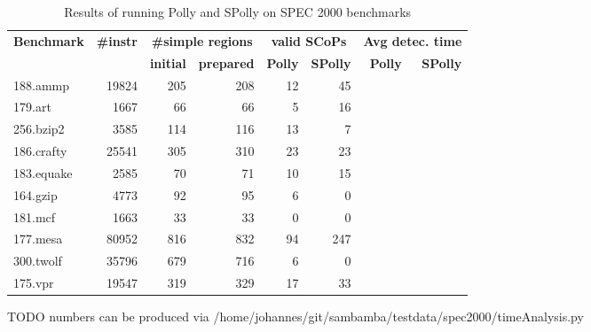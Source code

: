 \begin{table}[htbp]
  \caption{Results of running Polly and SPolly on SPEC 2000 benchmarks}
  \begin{tabular}{| l | r | r | r | r | r | r | r |}
    \hline
    \multirow{2}{*}{\textbf{Benchmark}} & \multirow{2}{*}{\textbf{\#instr}} & \multicolumn{2}{c|}{\textbf{\#simple regions}} &  \multicolumn{2}{c|}{\textbf{valid SCoPs}} &  \multicolumn{2}{c|}{\textbf{Avg detec. time}} \\
    \cline{3-8} 
    & & \textbf{initial} & \textbf{prepared} & \textbf{Polly} & \textbf{SPolly} & \textbf{Polly} & \textbf{SPolly} \\
    \hline
    \hline
    188.ammp   & 19824  & 205 & 208 & 12 & 45 & &  \\
    179.art    &  1667  & 66  &  66 &  5 & 16 & &  \\
    256.bzip2  &  3585  & 114 & 116 & 13 &  7 & &  \\
    186.crafty & 25541  & 305 & 310 & 23 & 23 & &  \\
    183.equake &  2585  &  70 &  71 & 10 & 15 & &  \\
    164.gzip   &  4773  &  92 &  95 &  6 &  0 & &  \\
    181.mcf    &  1663 &  33 &  33  &  0 &  0 & &  \\
    177.mesa   & 80952 & 816 & 832  & 94 &247 & &  \\
    300.twolf  & 35796 & 679 & 716  &  6 &  0 & &  \\
    175.vpr    & 19547 & 319 & 329  & 17 & 33 & &  \\
    \hline
  \end{tabular}
\end{table}
TODO numbers can be produced via /home/johannes/git/sambamba/testdata/spec2000/timeAnalysis.py


